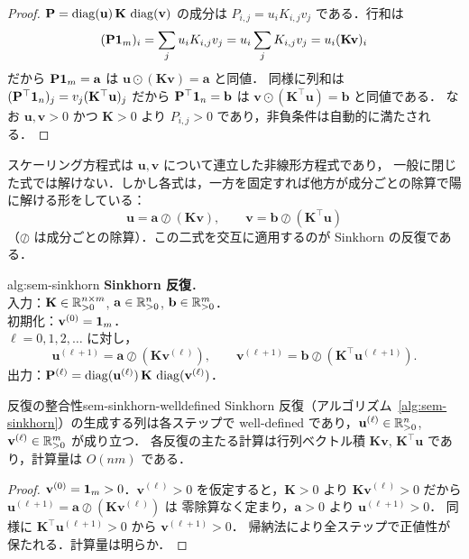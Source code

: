 \begin{proof}
  $\mathbf{P} = \operatorname{diag}(\mathbf{u})\,\mathbf{K}\,\operatorname{diag}(\mathbf{v})$ の成分は
  $P_{i,j} = u_i K_{i,j} v_j$ である．行和は
  \[
    (\mathbf{P}\mathbf{1}_m)_i
    = \sum_j u_i K_{i,j} v_j
    = u_i \sum_j K_{i,j} v_j
    = u_i (\mathbf{K}\mathbf{v})_i
  \]
  だから $\mathbf{P}\mathbf{1}_m = \mathbf{a}$ は $\mathbf{u}\odot(\mathbf{K}\mathbf{v}) = \mathbf{a}$ と同値．
  同様に列和は $(\mathbf{P}^\top\mathbf{1}_n)_j = v_j(\mathbf{K}^\top\mathbf{u})_j$ だから
  $\mathbf{P}^\top\mathbf{1}_n = \mathbf{b}$ は $\mathbf{v}\odot(\mathbf{K}^\top\mathbf{u}) = \mathbf{b}$ と同値である．
  なお $\mathbf{u}, \mathbf{v} > 0$ かつ $\mathbf{K} > 0$ より $P_{i,j} > 0$ であり，非負条件は自動的に満たされる．
\end{proof}

スケーリング方程式は $\mathbf{u}, \mathbf{v}$ について連立した非線形方程式であり，
一般に閉じた式では解けない．しかし各式は，一方を固定すれば他方が成分ごとの除算で陽に解ける形をしている：
\[
  \mathbf{u} = \mathbf{a} \oslash (\mathbf{K}\mathbf{v}),
  \qquad
  \mathbf{v} = \mathbf{b} \oslash (\mathbf{K}^\top\mathbf{u})
\]
（$\oslash$ は成分ごとの除算）．この二式を交互に適用するのが Sinkhorn の反復である．

\begin{algorithm}{alg:sem-sinkhorn}
  \textbf{Sinkhorn 反復}．\\
  入力：$\mathbf{K} \in \mathbb{R}_{>0}^{n\times m}$, $\mathbf{a} \in \mathbb{R}_{>0}^n$, $\mathbf{b} \in \mathbb{R}_{>0}^m$．\\
  初期化：$\mathbf{v}^{(0)} = \mathbf{1}_m$．\\
  $\ell = 0, 1, 2, \ldots$ に対し，
  \[
    \mathbf{u}^{(\ell+1)} = \mathbf{a} \oslash (\mathbf{K}\mathbf{v}^{(\ell)}),
    \qquad
    \mathbf{v}^{(\ell+1)} = \mathbf{b} \oslash (\mathbf{K}^\top\mathbf{u}^{(\ell+1)}).
  \]
  出力：$\mathbf{P}^{(\ell)} = \operatorname{diag}(\mathbf{u}^{(\ell)})\,\mathbf{K}\,\operatorname{diag}(\mathbf{v}^{(\ell)})$．
\end{algorithm}

\begin{proposition}{反復の整合性}{sem-sinkhorn-welldefined}
  Sinkhorn 反復（アルゴリズム~\ref{alg:sem-sinkhorn}）の生成する列は各ステップで
  well-defined であり，$\mathbf{u}^{(\ell)} \in \mathbb{R}_{>0}^n$, $\mathbf{v}^{(\ell)} \in \mathbb{R}_{>0}^m$ が成り立つ．
  各反復の主たる計算は行列ベクトル積 $\mathbf{K}\mathbf{v}$, $\mathbf{K}^\top\mathbf{u}$ であり，計算量は $O(nm)$ である．
\end{proposition}

\begin{proof}
  $\mathbf{v}^{(0)} = \mathbf{1}_m > 0$．$\mathbf{v}^{(\ell)} > 0$ を仮定すると，$\mathbf{K} > 0$ より
  $\mathbf{K}\mathbf{v}^{(\ell)} > 0$ だから $\mathbf{u}^{(\ell+1)} = \mathbf{a}\oslash(\mathbf{K}\mathbf{v}^{(\ell)})$ は
  零除算なく定まり，$\mathbf{a} > 0$ より $\mathbf{u}^{(\ell+1)} > 0$．
  同様に $\mathbf{K}^\top\mathbf{u}^{(\ell+1)} > 0$ から $\mathbf{v}^{(\ell+1)} > 0$．
  帰納法により全ステップで正値性が保たれる．計算量は明らか．
\end{proof}

